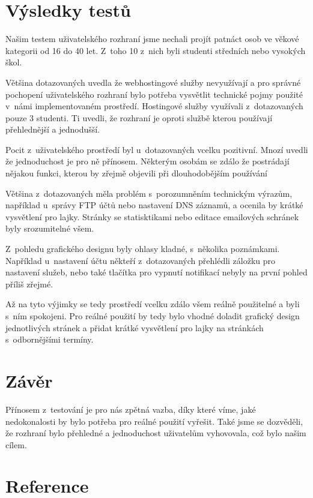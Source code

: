 \documentclass[11pt,a4paper]{article}
\begin{document}
  \section{Výsledky testů}

    Našim testem uživatelského rozhraní jsme nechali projít patnáct osob ve
    věkové kategorii od 16 do 40 let. Z~toho 10 z~nich byli studenti středních
    nebo vysokých škol.

    Většina dotazovaných uvedla že webhostingové služby nevyužívají a pro
    správné pochopení uživatelského rozhraní bylo potřeba vysvětlit technické
    pojmy použité v~námi implementovaném prostředí.
    Hostingové služby využívali z~dotazovaných pouze 3 studenti. Ti uvedli, že
    rozhraní je oproti službě kterou používají přehlednější a jednodušší.

    Pocit z~uživatelského prostředí byl u~dotazovaných vcelku pozitivní.
    Mnozí uvedli že jednoduchost je pro ně přínosem. Některým osobám se zdálo
    že postrádají nějakou funkci, kterou by zřejmě objevili při dlouhodobějším
    používání

    Většina z~dotazovaných měla problém s~porozumněním technickým výrazům,
    například u~správy FTP účtů nebo nastavení DNS záznamů,
    a ocenila by krátké vysvětlení pro lajky. Stránky se statisktikami nebo
    editace emailových schránek byly srozumitelné všem.

    Z~pohledu grafického designu byly ohlasy kladné, s~několika poznámkami.
    Například u~nastavení účtu někteří z~dotazovaných přehlédli záložku
    pro nastavení služeb, nebo také tlačítka pro vypnutí notifikací nebyly
    na první pohled příliš zřejmé.

    Až na tyto výjimky se tedy prostředí vcelku zdálo všem reálně použitelné a
    byli s~ním spokojeni. Pro reálné použití by tedy bylo vhodné doladit
    grafický design jednotlivých stránek a přidat krátké vysvětlení pro lajky
    na stránkách s~odbornějšími termíny.

  \section{Závěr}

    Přínosem z~testování je pro nás zpětná vazba, díky které víme, jaké
    nedokonalosti by bylo potřeba pro reálné použití vyřešit. Také jsme se
    dozvěděli, že rozhraní bylo přehledné a jednoduchost uživatelům vyhovovala,
    což bylo našim cílem.

  \section{Reference}
\end{document}
